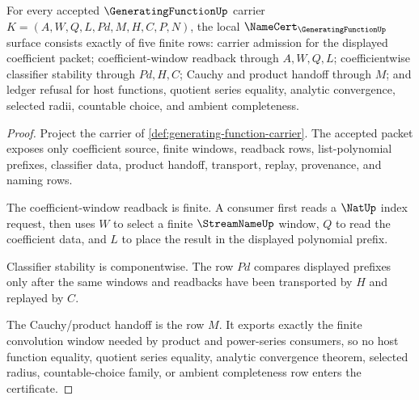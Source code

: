 \begin{theorem}
\label{thm:generating-function-namecert-obligations}
For every accepted $\GeneratingFunctionUp$ carrier $K=(A,W,Q,L,Pd,M,H,C,P,N)$, the local $\NameCert_{\GeneratingFunctionUp}$ surface consists exactly of five finite rows: carrier admission for the displayed coefficient packet; coefficient-window readback through $A,W,Q,L$; coefficientwise classifier stability through $Pd,H,C$; Cauchy and product handoff through $M$; and ledger refusal for host functions, quotient series equality, analytic convergence, selected radii, countable choice, and ambient completeness.
\end{theorem}
\begin{proof}
Project the carrier of \autoref{def:generating-function-carrier}. The accepted packet exposes only coefficient source, finite windows, readback rows, list-polynomial prefixes, classifier data, product handoff, transport, replay, provenance, and naming rows.

The coefficient-window readback is finite. A consumer first reads a $\NatUp$ index request, then uses $W$ to select a finite $\StreamNameUp$ window, $Q$ to read the coefficient data, and $L$ to place the result in the displayed polynomial prefix.

Classifier stability is componentwise. The row $Pd$ compares displayed prefixes only after the same windows and readbacks have been transported by $H$ and replayed by $C$.

The Cauchy/product handoff is the row $M$. It exports exactly the finite convolution window needed by product and power-series consumers, so no host function equality, quotient series equality, analytic convergence theorem, selected radius, countable-choice family, or ambient completeness row enters the certificate.
\end{proof}

